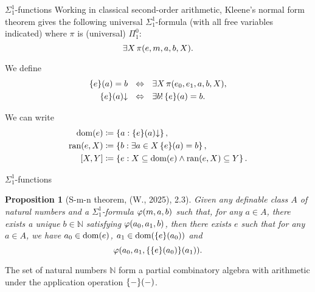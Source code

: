 \documentclass{beamer}
\newtheorem{proposition}{Proposition}
\theoremstyle{definition}
\begin{document}
\begin{frame}{$\Sigma^1_1$-functions}
  Working in classical second-order arithmetic, Kleene's normal form theorem gives the following universal $\Sigma^1_1$-formula (with all free variables indicated) where $\pi$ is (universal) $\Pi^0_1$:
  \[\exists X \, \pi\mleft(e, m, a, b, X\mright).\]

  We define
  \begin{align*}
    \mleft\{e\mright\}\mleft(a\mright) = b \ \           & \Leftrightarrow \ \ \exists X \, \pi\mleft(e_0, e_1, a, b, X\mright),     \\
    \mleft\{e\mright\}\mleft(a\mright) {\downarrow} \ \  & \Leftrightarrow \ \ \exists b! \, \mleft\{e\mright\}\mleft(a\mright) = b.
  \end{align*}

  We can write
  \begin{align*}
    \mathrm{dom}\mleft(e\mright)    & \coloneqq \left\{a : \mleft\{e\mright\}\mleft(a\mright) {\downarrow}\right\},                                            \\
    \mathrm{ran}\mleft(e, X\mright) & \coloneqq \left\{b : \exists a \in X \, \mleft\{e\mright\}\mleft(a\mright) = b\right\},                                  \\
    \left[X, Y\right]               & \coloneqq \left\{e : X \subseteq \mathrm{dom}\mleft(e\mright) \land \mathrm{ran}\mleft(e, X\mright) \subseteq Y\right\}.
  \end{align*}
\end{frame}

\begin{frame}{$\Sigma^1_1$-functions}
  \begin{proposition}[S-m-n theorem, (W., 2025), 2.3]
    Given any definable class $A$ of natural numbers and a $\Sigma^1_1$-formula $\varphi\mleft(m, a, b\mright)$ such that, for any $a \in A$, there exists a unique $b \in \mathbb{N}$ satisfying $\varphi\mleft(a_0, a_1, b\mright)$, then there exists $e$ such that for any $a \in A$, we have $a_0 \in \mathrm{dom}\mleft(e\mright)$, $a_1 \in \mathrm{dom}\mleft(\mleft\{e\mright\}\mleft(a_0\mright)\mright)$ and
    \[\varphi\mleft(a_0, a_1, \mleft\{\mleft\{e\mright\}\mleft(a_0\mright)\mright\}\mleft(a_1\mright)\mright).\]
  \end{proposition}

  \begin{corollary}
    The set of natural numbers $\mathbb{N}$ form a partial combinatory algebra with arithmetic under the application operation $\mleft\{-\mright\}\mleft(-\mright)$.
  \end{corollary}
\end{frame}
\end{document}
